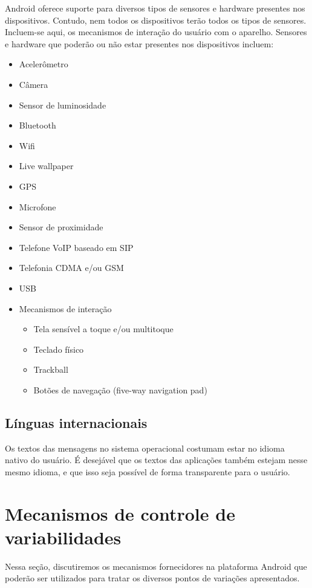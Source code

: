 Android oferece suporte para diversos tipos de sensores e hardware presentes nos 
dispositivos. Contudo, nem todos os dispositivos terão todos os tipos de sensores.
Incluem-se aqui, os mecanismos de interação do usuário com o aparelho.
Sensores e hardware que poderão ou não estar presentes nos dispositivos incluem:
\begin{itemize}
    \item Acelerômetro
    \item Câmera
    \item Sensor de luminosidade
    \item Bluetooth
    \item Wifi
    \item Live wallpaper
    \item GPS
    \item Microfone
    \item Sensor de proximidade
    \item Telefone VoIP baseado em SIP
    \item Telefonia CDMA e/ou GSM
    \item USB
    \item Mecanismos de interação
    \begin{itemize}
        \item Tela sensível a toque e/ou multitoque
        \item Teclado físico
        \item Trackball
        \item Botões de navegação (five-way navigation pad)
    \end{itemize}
\end{itemize}


\subsection{Línguas internacionais}
Os textos das mensagens no sistema operacional costumam estar no idioma nativo do usuário.
É desejável que os textos das aplicações também estejam nesse mesmo idioma, e que 
isso seja possível de forma transparente para o usuário.

\section{Mecanismos de controle de variabilidades}

Nessa seção, discutiremos os mecanismos fornecidores na plataforma Android que 
poderão ser utilizados para tratar os diversos pontos de variações apresentados.

